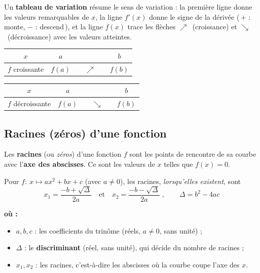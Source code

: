 \documentclass[11pt,a4paper]{article}
\newenvironment{ou}{%
  \par\smallskip\noindent\textbf{où :}\nopagebreak
  \begin{itemize}[leftmargin=1.8em,topsep=2pt,itemsep=1.5pt,parsep=0pt]}%
  {\end{itemize}}
\newcommand{\croit}{\textcolor{varcol}{\Large$\nearrow$}}
\newcommand{\decroit}{\textcolor{varcol}{\Large$\searrow$}}
\begin{document}
\begin{remarque}
Un \textbf{tableau de variation} résume le sens de variation : la première ligne donne
les valeurs remarquables de $x$, la ligne $f'(x)$ donne le signe de la dérivée
(\,$+$ : monte, $-$ : descend\,), et la ligne $f(x)$ trace les flèches
\croit\ (croissance) et \decroit\ (décroissance) avec les valeurs atteintes.
\end{remarque}

\begin{center}
\renewcommand{\arraystretch}{1.6}
\setlength{\tabcolsep}{10pt}
\begin{tabular}{|c|ccccc|}
\hline
\rowcolor{primarylight}
$x$ & $a$ & & & & $b$ \\
\hline
$f$ croissante & $f(a)$ & & \croit & & $f(b)$ \\
\hline
\end{tabular}
\qquad
\begin{tabular}{|c|ccccc|}
\hline
\rowcolor{primarylight}
$x$ & $a$ & & & & $b$ \\
\hline
$f$ décroissante & $f(a)$ & & \decroit & & $f(b)$ \\
\hline
\end{tabular}
\end{center}

\subsection{Racines (zéros) d'une fonction}

\begin{definition}
Les \textbf{racines} (ou \emph{zéros}) d'une fonction $f$ sont les points de rencontre de
sa courbe avec l'\textbf{axe des abscisses}. Ce sont les valeurs de $x$ telles que
$f(x)=0$.
\end{definition}

\begin{formule}
Pour $f:\ x\mapsto ax^2+bx+c$ (avec $a\neq 0$), les racines, \emph{lorsqu'elles existent}, sont
\[
  \boxed{\;x_1=\dfrac{-b+\sqrt{\Delta}}{2a}\quad\text{et}\quad
          x_2=\dfrac{-b-\sqrt{\Delta}}{2a}\;,\qquad \Delta=b^2-4ac\;}
\]
\begin{ou}
  \item $a,b,c$ : les coefficients du trinôme (réels, $a\neq 0$, sans unité) ;
  \item $\Delta$ : le \textbf{discriminant} (réel, sans unité), qui décide du nombre de racines ;
  \item $x_1,x_2$ : les racines, c'est-à-dire les abscisses où la courbe coupe l'axe des $x$.
\end{ou}
\end{formule}
\end{document}
